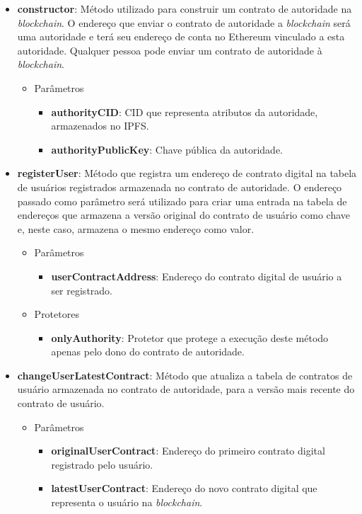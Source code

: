 \documentclass[tcc,capa]{texufpel}
\begin{document}
    \begin{itemize}
        \item \textbf{constructor}: Método utilizado para construir um contrato de autoridade na \textit{blockchain}. O endereço que enviar o contrato de autoridade a \textit{blockchain} será uma autoridade e terá seu endereço de conta no Ethereum vinculado a esta autoridade. Qualquer pessoa pode enviar um contrato de autoridade à \textit{blockchain}.
        \begin{itemize}
            \item Parâmetros
            \begin{itemize}
                \item \textbf{authorityCID}: CID que representa atributos da autoridade, armazenados no IPFS.
                \item \textbf{authorityPublicKey}: Chave pública da autoridade.
            \end{itemize}
        \end{itemize}
        
        \item \textbf{registerUser}: Método que registra um endereço de contrato digital na tabela de usuários registrados armazenada no contrato de autoridade. O endereço passado como parâmetro será utilizado para criar uma entrada na tabela de endereços que armazena a versão original do contrato de usuário como chave e, neste caso, armazena o mesmo endereço como valor.
        \begin{itemize}
            \item Parâmetros
            \begin{itemize}
                \item \textbf{userContractAddress}: Endereço do contrato digital de usuário a ser registrado.
            \end{itemize}
            
            \item Protetores
            \begin{itemize}
                \item \textbf{onlyAuthority}: Protetor que protege a execução deste método apenas pelo dono do contrato de autoridade.
            \end{itemize}
        \end{itemize}
        
        \item \textbf{changeUserLatestContract}: Método que atualiza a tabela de contratos de usuário armazenada no contrato de autoridade, para a versão mais recente do contrato de usuário.
        \begin{itemize}
            \item Parâmetros
            \begin{itemize}
                \item \textbf{originalUserContract}: Endereço do primeiro contrato digital registrado pelo usuário.
                \item \textbf{latestUserContract}: Endereço do novo contrato digital que representa o usuário na \textit{blockchain}.
            \end{itemize}
            

\end{itemize}
\end{itemize}
\end{document}
